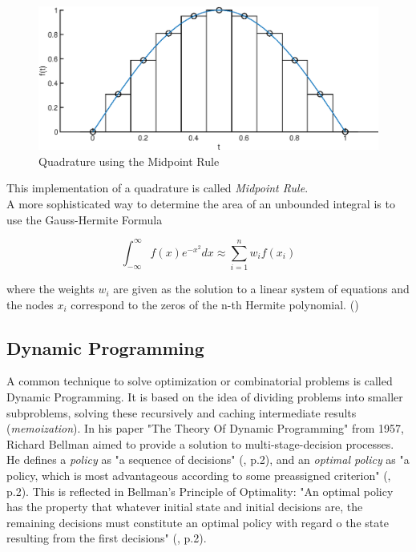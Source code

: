 \documentclass[12pt, a4paper, oneside]{article}
\begin{document}
	\begin{figure}[ht] 
		\includegraphics[width=1\textwidth]{figures/quadratureA.eps}
		\caption{Quadrature using the Midpoint Rule}
		\label{fig:quadrature-a}
	\end{figure}
This implementation of a quadrature is called \emph{Midpoint Rule}. 
\\

A more sophisticated way to determine the area of an unbounded integral is to use the Gauss-Hermite Formula

	\begin{equation}
	\int_{-\infty}^{\infty} f(x)e^{-x^2} dx \approx \sum_{i=1}^{n}{w_if(x_i)}
	\end{equation}

where the weights $w_i$ are given as the solution to a linear system of equations and the nodes $x_i$ correspond to the zeros of the n-th Hermite polynomial. (\cite{seminar:week6})

\subsection{Dynamic Programming}

A common technique to solve optimization or combinatorial problems is called Dynamic Programming. 
It is based on the idea of dividing problems into smaller subproblems, solving these recursively and caching intermediate results (\textit{memoization}). 
In his paper "The Theory Of Dynamic Programming" from 1957, Richard Bellman aimed to provide a solution to multi-stage-decision processes. 
He defines a \textit{policy} as "a sequence of decisions" (\cite{bellman:1957}, p.2), and an \textit{optimal policy} as "a policy, which is most advantageous according to some preassigned criterion" (\cite{bellman:1957}, p.2). 
This is reflected in Bellman's Principle of Optimality: "An optimal policy has the property that whatever initial state and initial decisions are, the remaining decisions must constitute an optimal policy with regard o the state resulting from the first decisions" (\cite{bellman:1957}, p.2). 
\end{document}
